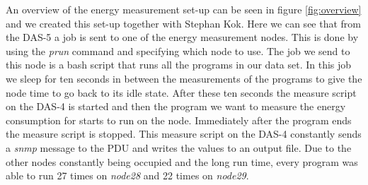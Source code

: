 An overview of the energy measurement set-up can be seen in figure \ref{fig:overview} and we created this set-up together with Stephan Kok. Here we can see that from the DAS-5 a job is sent to one of the energy measurement nodes. This is done by using the \textit{prun} command and specifying which node to use. The job we send to this node is a bash script that runs all the programs in our data set. In this job we sleep for ten seconds in between the measurements of the programs to give the node time to go back to its idle state. After these ten seconds the measure script on the DAS-4 is started and then the program we want to measure the energy consumption for starts to run on the node. Immediately after the program ends the measure script is stopped. This measure script on the DAS-4 constantly sends a \textit{snmp} message to the PDU and writes the values to an output file. Due to the other nodes constantly being occupied and the long run time, every program was able to run 27 times on \textit{node28} and 22 times on \textit{node29}.


